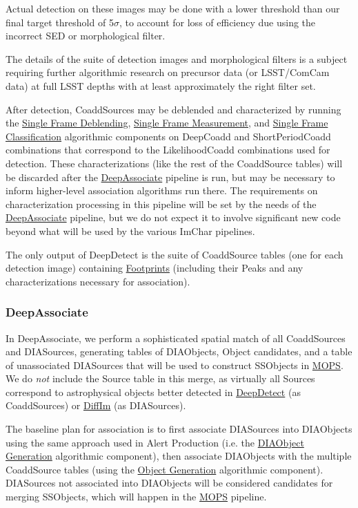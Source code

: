 Actual detection on these images may be done with a lower threshold than our final target threshold of 5$\sigma$, to account for loss of efficiency due using the incorrect SED or morphological filter.

The details of the suite of detection images and morphological filters is a subject requiring further algorithmic research on precursor data (or LSST/ComCam data) at full LSST depths with at least approximately the right filter set.

After detection, CoaddSources may be deblended and characterized by running the \hyperref[sec:acSingleFrameDeblending]{Single Frame Deblending}, \hyperref[sec:acSingleFrameMeasurement]{Single Frame Measurement}, and \hyperref[sec:acSingleFrameClassification]{Single Frame Classification} algorithmic components on DeepCoadd and ShortPeriodCoadd combinations that correspond to the LikelihoodCoadd combinations used for detection.  These characterizations (like the rest of the CoaddSource tables) will be discarded after the \hyperref[sec:drpDeepAssociate]{DeepAssociate} pipeline is run, but may be necessary to inform higher-level association algorithms run there.  The requirements on characterization processing in this pipeline will be set by the needs of the \hyperref[sec:drpDeepAssociate]{DeepAssociate} pipeline, but we do not expect it to involve significant new code beyond what will be used by the various ImChar pipelines.

The only output of DeepDetect is the suite of CoaddSource tables (one for each detection image) containing \hyperref[sec:spFootprints]{Footprints} (including their Peaks and any characterizations necessary for association).

\subsubsection{DeepAssociate}
\label{sec:drpDeepAssociate}

In DeepAssociate, we perform a sophisticated spatial match of all CoaddSources and DIASources, generating tables of DIAObjects, Object candidates, and a table of unassociated DIASources that will be used to construct SSObjects in \hyperref[sec:drpMOPS]{MOPS}.  We do \emph{not} include the Source table in this merge, as virtually all Sources correspond to astrophysical objects better detected in \hyperref[sec:drpDeepDetect]{DeepDetect} (as CoaddSources) or \hyperref[sec:drpDiffIm]{DiffIm} (as DIASources).

The baseline plan for association is to first associate DIASources into DIAObjects using the same approach used in Alert Production (i.e. the \hyperref[sec:acDIAObjectGeneration]{DIAObject Generation} algorithmic component), then associate DIAObjects with the multiple CoaddSource tables (using the \hyperref[sec:acObjectGeneration]{Object Generation} algorithmic component).  DIASources not associated into DIAObjects will be considered candidates for merging SSObjects, which will happen in the \hyperref[sec:drpMOPS]{MOPS} pipeline.


